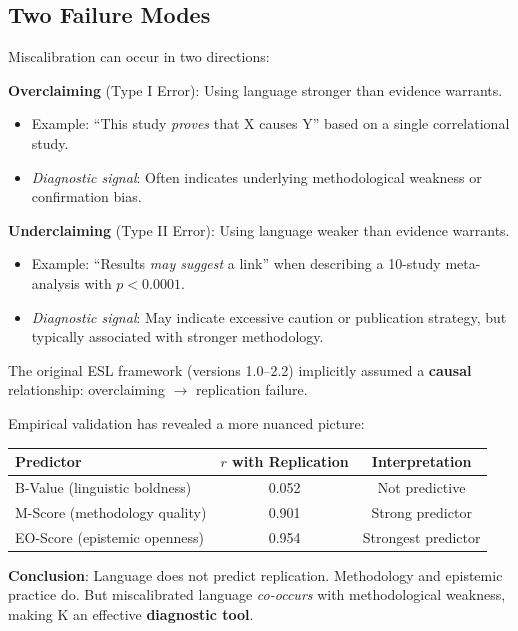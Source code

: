 \documentclass[11pt,a4paper]{article}
\begin{document}
\subsection{Two Failure Modes}

Miscalibration can occur in two directions:

\begin{keyinsight}[title={The Two Faces of Epistemic Miscalibration}]
\textbf{Overclaiming} (Type I Error): Using language stronger than evidence warrants.
\begin{itemize}
    \item Example: ``This study \textit{proves} that X causes Y'' based on a single correlational study.
    \item \textit{Diagnostic signal}: Often indicates underlying methodological weakness or confirmation bias.
\end{itemize}

\textbf{Underclaiming} (Type II Error): Using language weaker than evidence warrants.
\begin{itemize}
    \item Example: ``Results \textit{may suggest} a link'' when describing a 10-study meta-analysis with $p < 0.0001$.
    \item \textit{Diagnostic signal}: May indicate excessive caution or publication strategy, but typically associated with stronger methodology.
\end{itemize}
\end{keyinsight}

\begin{warningbox}[title={Critical Distinction: Diagnosis vs. Causation}]
The original ESL framework (versions 1.0--2.2) implicitly assumed a \textbf{causal} relationship: overclaiming $\rightarrow$ replication failure.

Empirical validation has revealed a more nuanced picture:

\begin{center}
\begin{tabular}{lcc}
\toprule
\textbf{Predictor} & \textbf{$r$ with Replication} & \textbf{Interpretation} \\
\midrule
B-Value (linguistic boldness) & 0.052 & \textcolor{eslred}{Not predictive} \\
M-Score (methodology quality) & 0.901 & \textcolor{eslgreen}{Strong predictor} \\
EO-Score (epistemic openness) & 0.954 & \textcolor{eslgreen}{Strongest predictor} \\
\bottomrule
\end{tabular}
\end{center}

\textbf{Conclusion}: Language does not predict replication. Methodology and epistemic practice do. But miscalibrated language \textit{co-occurs} with methodological weakness, making K an effective \textbf{diagnostic tool}.
\end{warningbox}
\end{document}
